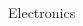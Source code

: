 \begin{frame}{Electronics}
\begin{columns}[c, onlytextwidth]
\begin{column}{0.35\textwidth}
        \end{column}

    \end{columns}

\end{frame}